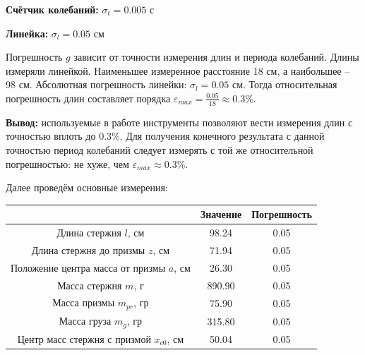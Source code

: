 \documentclass[12pt, a4paper]{article}
\begin{document}
\textbf{Счётчик колебаний:} $\sigma_t = 0.005$ с

\textbf{Линейка:} $\sigma_l = 0.05$ см

Погрешность $g$ зависит от точности измерения длин и периода колебаний. Длины
измеряли линейкой. Наименьшее измеренное расстояние 18 см, а наибольшее --
98 см. Абсолютная погрешность линейки: $\sigma_l = 0.05$ см.
Тогда относительная погрешность длин составляет порядка
$\varepsilon_{max} = \frac{0.05}{18} \approx 0.3\%$.

\textbf{Вывод:} используемые в работе инструменты позволяют вести измерения
длин с точностью вплоть до 0.3\%. Для получения конечного результата с данной
точностью период колебаний следует измерять с той же относительной
погрешностью: не хуже, чем $\varepsilon_{max} \approx 0.3\%$.

Далее проведём основные измерения:

\begin{center}
    \begin{tabular}{|c|c|c|}
        \hline

        & Значение & Погрешность \\
        \hline

        Длина стержня $l$, см & 98.24 & 0.05 \\

        \hline

        Длина стержня до призмы $z$, см & 71.94 & 0.05 \\

        \hline

        Положение центра масса от призмы $a$, см & 26.30 & 0.05 \\

        \hline

        Масса стержня $m$, г & 890.90 & 0.05 \\

        \hline

        Масса призмы $m_{pr}$, гр & 75.90 & 0.05 \\

        \hline

        Масса груза $m_{g}$, гр & 315.80 & 0.05 \\

        \hline

        Центр масс стержня с призмой $x_{c0}$, см & 50.04 & 0.05 \\

        \hline
    \end{tabular}
\end{center}
\end{document}
